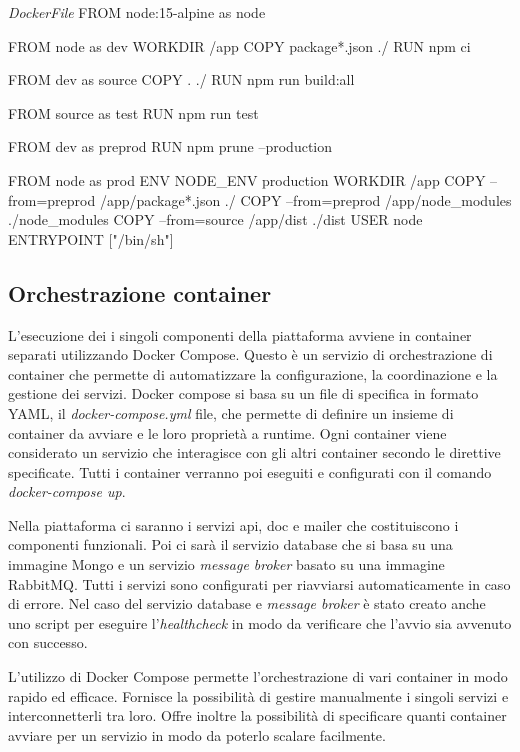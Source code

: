 \begin{docker}[label={lst:DockerFile}]
    {\textit{DockerFile}}
    FROM node:15-alpine as node

    FROM node as dev
    WORKDIR /app
    COPY package*.json ./
    RUN npm ci

    FROM dev as source
    COPY . ./
    RUN npm run build:all

    FROM source as test
    RUN npm run test

    FROM dev as preprod
    RUN npm prune --production

    FROM node as prod
    ENV NODE_ENV production
    WORKDIR /app
    COPY --from=preprod /app/package*.json ./
    COPY --from=preprod /app/node_modules ./node_modules
    COPY --from=source /app/dist ./dist
    USER node
    ENTRYPOINT ["/bin/sh"]

\end{docker}

\subsection{Orchestrazione container}
L'esecuzione dei i singoli componenti della piattaforma avviene in container separati utilizzando Docker Compose.
Questo è un servizio di orchestrazione di container che permette di automatizzare la configurazione, la coordinazione
e la gestione dei servizi. Docker compose si basa su un file di specifica in formato YAML, il \textit{docker-compose.yml} file, che
permette di definire un insieme di container da avviare e le loro proprietà a runtime.
Ogni container viene considerato un servizio che interagisce con gli altri container secondo
le direttive specificate. Tutti i container verranno poi eseguiti e configurati con il comando \textit{docker-compose up}.

Nella piattaforma ci saranno i servizi api, doc e mailer che costituiscono i componenti funzionali.
Poi ci sarà il servizio database che si basa su una immagine Mongo e un servizio \textit{message broker} basato su una immagine RabbitMQ.
Tutti i servizi sono configurati per riavviarsi automaticamente in caso di errore. Nel caso del servizio database e \textit{message broker} è stato
creato anche uno script per eseguire l'\textit{healthcheck} in modo da verificare che l'avvio sia avvenuto con successo.

L'utilizzo di Docker Compose permette l'orchestrazione di vari container in modo rapido ed efficace. Fornisce la possibilità
di gestire manualmente i singoli servizi e interconnetterli tra loro. Offre inoltre la possibilità di specificare quanti container
avviare per un servizio in modo da poterlo scalare facilmente.


